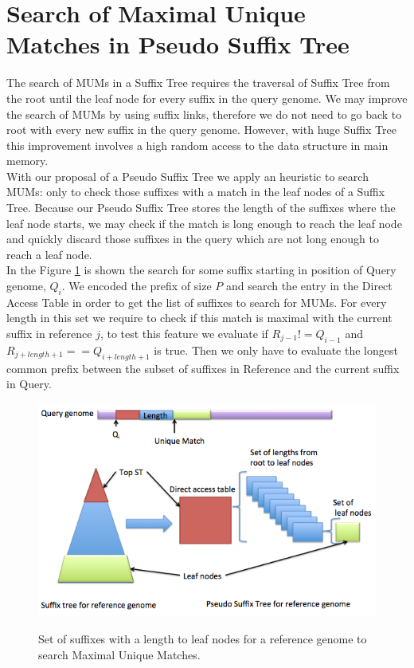 \documentclass[runningheads,a4paper]{llncs}
\begin{document}
\section{Search of Maximal Unique Matches in Pseudo Suffix Tree}
The search of MUMs in a Suffix Tree requires the traversal of Suffix Tree from the root until the leaf node for every suffix in the query genome. We may improve the search of MUMs by using suffix links, therefore we do not need to go back to root with every new suffix in the query genome.  However, with huge Suffix Tree this improvement involves a high random access to the data structure in main memory. \\
With our proposal of a Pseudo Suffix Tree we apply an heuristic to search MUMs: only to check those suffixes with a match in the leaf nodes of a Suffix Tree. Because our Pseudo Suffix Tree stores the length of the suffixes where the leaf node starts, we may check if the match is long enough to reach the leaf node and quickly discard those suffixes in the query which are not long enough to reach a leaf node.\\
In the Figure \ref{fig:algo} is shown the search for some suffix starting in position of Query genome, $Q_{i}$. We encoded the prefix of size $P$ and search the entry in the Direct Access Table in order to get the list of suffixes to search for MUMs. For every length in this set we require to check if this match is maximal with the current suffix in reference $j$, to test this feature we evaluate if $R_{j-1}!=Q_{i-1}$ and $R_{j+length+1}==Q_{i+length+1}$ is true. Then we only have to evaluate the longest common prefix between the subset of suffixes in Reference and the current suffix in Query. \\
\begin{figure}
\centering
\includegraphics[scale=0.5]{pseudost-mum.png}
\label{fig:algo}
\caption{Set of suffixes with a length to leaf nodes for a reference genome to search Maximal Unique Matches.}
\end{figure}
\end{document}
